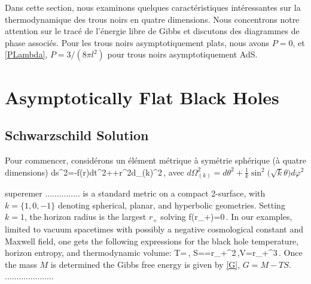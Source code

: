 Dans cette section, nous examinons quelques caractéristiques intéressantes sur la thermodynamique des trous noirs en quatre dimensions. Nous concentrons notre attention sur le tracé de l'énergie libre de Gibbs et discutons des diagrammes de phase associés.
Pour les trous noirs asymptotiquement plats, nous avons $P=0$, et  \eqref{PLambda}, $P=3/(8\pi l^2)$ pour trous noirs asymptotiquement AdS.


 \section{Asymptotically Flat Black Holes}

 

 
\subsection{Schwarzschild Solution} 

Pour commencer, considérons un élément métrique à symétrie sphérique (à quatre dimensions) 
\be\label{ss}
ds^2=-f(r)dt^2++r^2d\Omega_{(k)}^2\,,
\ee
avec $d\Omega_{(k)}^2=d\theta^2+\frac{1}{k}\sin^2\!\bigl(\sqrt{k}\theta\bigr) d\varphi^2$ 

superemer ...............
is a standard metric on a compact 2-surface, with $k=\{1,0,-1\}$ denoting spherical, planar, and hyperbolic geometries.   Setting
$k=1$, the horizon radius is the largest $r_+$ solving
\be
f(r_+)=0\,.
\ee
In our examples, limited to vacuum spacetimes with possibly a negative cosmological constant
and Maxwell field, one gets the following expressions for the black hole temperature, horizon entropy, and thermodynamic volume:
\be\label{SSgeneral}
T=\,,\quad
S==\pi r_+^2\,,\quad V=\pi r_+^3\,.
\ee
Once the mass $M$ is determined the Gibbs free energy is given by \eqref{G}, $G=M-TS$.
.....................

